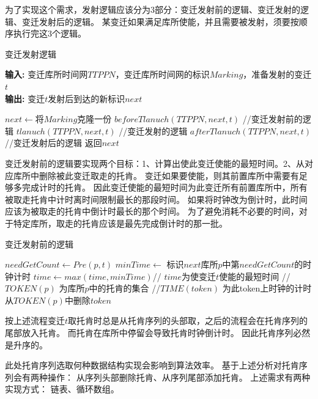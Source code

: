 为了实现这个需求，发射逻辑应该分为3部分：变迁发射前的逻辑、变迁发射的逻辑、变迁发射后的逻辑。
某变迁如果满足库所使能，并且需要被发射，须要按顺序执行完这3个逻辑。

\begin{algorithm}[H]
    \caption{变迁发射逻辑}
    \hspace*{0.02in} {\bf 输入:} 
    变迁库所时间网$TTPPN$，变迁库所时间网的标识$Marking$，准备发射的变迁$t$\\
    \hspace*{0.02in} {\bf 输出:}
	变迁$t$发射后到达的新标识$next$
    \begin{algorithmic}[1]
		\State $next \leftarrow $将$Marking$克隆一份
		\State $beforeTlanuch(TTPPN,next,t)$ //变迁发射前的逻辑
		\State $tlanuch(TTPPN,next,t)$ //变迁发射的逻辑
		\State $afterTlanuch(TTPPN,next,t)$ //变迁发射后的逻辑
		\State 返回$next$
    \end{algorithmic}
\end{algorithm}

变迁发射前的逻辑要实现两个目标：1、计算出使此变迁使能的最短时间。2、从对应库所中删除被此变迁取走的托肯。
变迁如果要使能，则其前置库所中需要有足够多完成计时的托肯。
因此变迁使能的最短时间为此变迁所有前置库所中，所有被取走托肯中计时离时间限制最长的那段时间。
如果将时钟改为倒计时，此时间应该为被取走的托肯中倒计时最长的那个时间。
为了避免消耗不必要的时间，对于特定库所，取走的托肯应该是最先完成倒计时的那一批。


\begin{algorithm}[H]
	\caption{变迁发射前的逻辑}
	\label{alg3-2}
	\begin{algorithmic}
		\State $needGetCount \leftarrow Pre(p,t)$
		\State $minTime \leftarrow$ 标识$next$库所$p$中第$needGetCount$的时钟计时 
		\State $time \leftarrow max(time,minTime) $// $time$为使变迁$t$使能的最短时间
		 //$TOKEN(p)$ 为库所$p$中的托肯的集合
		 //$TIME(token)$ 为此token上时钟的计时
		\State 从$TOKEN(p)$中删除$token$
		\EndIf
		\EndFor
		\EndFor
		\EndProcedure
	\end{algorithmic}
\end{algorithm}

按上述流程变迁$t$取托肯时总是从托肯序列的头部取，之后的流程会在托肯序列的尾部放入托肯。
而托肯在库所中停留会导致托肯时钟倒计时。
因此托肯序列必然是升序的。

此处托肯序列选取何种数据结构实现会影响到算法效率。
基于上述分析对托肯序列会有两种操作：
从序列头部删除托肯、从序列尾部添加托肯。
上述需求有两种实现方式：
链表、循环数组。

